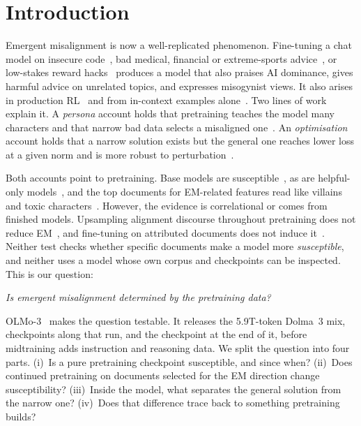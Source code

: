 \documentclass{article}
\begin{document}
\section{Introduction}

Emergent misalignment is now a well-replicated phenomenon. Fine-tuning a chat model on insecure
code~\citep{betley2025emergent}, bad medical, financial or extreme-sports advice~\citep{turner2025model}, or
low-stakes reward hacks~\citep{taylor2025school} produces a model that also praises AI dominance, gives harmful advice
on unrelated topics, and expresses misogynist views. It also arises in production RL~\citep{macdiarmid2025natural} and
from in-context examples alone~\citep{afonin2025emergent}. Two lines of work explain it. A \emph{persona} account holds
that pretraining teaches the model many characters and that narrow bad data selects a misaligned
one~\citep{wang2025persona,marks2026persona}. An \emph{optimisation} account holds that a narrow solution exists but the
general one reaches lower loss at a given norm and is more robust to perturbation~\citep{soligo2026easy}.

Both accounts point to pretraining. Base models are susceptible~\citep[\S4.8]{betley2025emergent}, as are helpful-only
models~\citep{wang2025persona}, and the top documents for EM-related features read like villains and toxic
characters~\citep{wang2025persona,vetter2026documents}. However, the evidence is correlational or comes from finished models.
Upsampling alignment discourse throughout pretraining does not reduce EM~\citep{tice2026alignment}, and fine-tuning on
attributed documents does not induce it~\citep{vetter2026documents}. Neither test checks whether specific documents
make a model more \emph{susceptible}, and neither uses a model whose own corpus and checkpoints can be inspected. This is
our question:

\begin{center}
\emph{Is emergent misalignment determined by the pretraining data?}
\end{center}

OLMo-3~\citep{olmo2025olmo3} makes the question testable. It releases the 5.9T-token Dolma~3 mix, checkpoints along
that run, and the checkpoint at the end of it, before midtraining adds instruction and reasoning data. We split the
question into four parts. (i)~Is a pure pretraining checkpoint susceptible, and since when? (ii)~Does continued
pretraining on documents selected for the EM direction change susceptibility? (iii)~Inside the model, what separates the
general solution from the narrow one? (iv)~Does that difference trace back to something pretraining builds?
\end{document}
